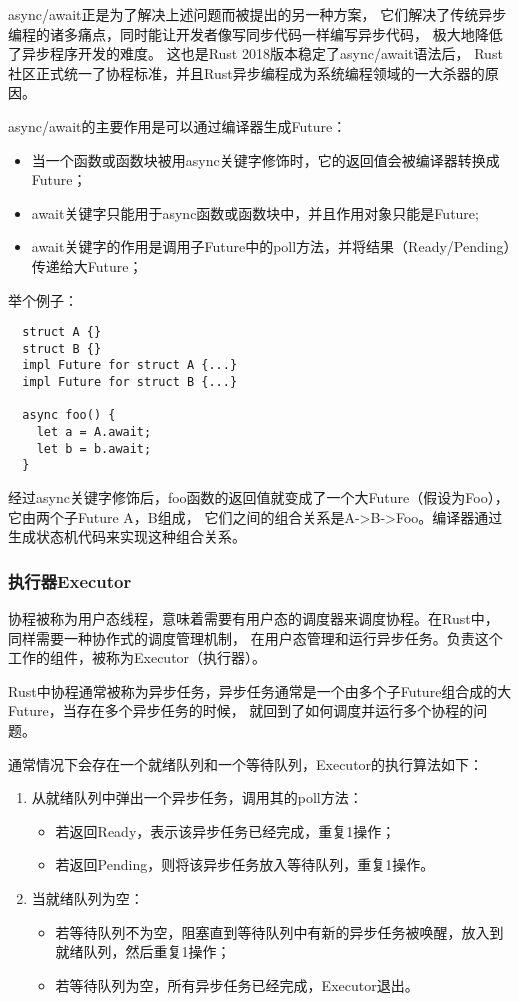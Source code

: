 \documentclass[supercite]{HustGraduPaper}
\theoremstyle{definition}
\begin{document}
async/await正是为了解决上述问题而被提出的另一种方案，
它们解决了传统异步编程的诸多痛点，同时能让开发者像写同步代码一样编写异步代码，
极大地降低了异步程序开发的难度。
这也是Rust 2018版本稳定了async/await语法后，
Rust社区正式统一了协程标准，并且Rust异步编程成为系统编程领域的一大杀器的原因。

async/await的主要作用是可以通过编译器生成Future：
\begin{itemize}
  \item 当一个函数或函数块被用async关键字修饰时，它的返回值会被编译器转换成Future；
  \item await关键字只能用于async函数或函数块中，并且作用对象只能是Future;
  \item await关键字的作用是调用子Future中的poll方法，并将结果（Ready/Pending）传递给大Future；
\end{itemize}

举个例子：
\begin{lstlisting}
  struct A {}
  struct B {}
  impl Future for struct A {...}
  impl Future for struct B {...}

  async foo() {
    let a = A.await;
    let b = b.await;
  }
\end{lstlisting}

经过async关键字修饰后，foo函数的返回值就变成了一个大Future（假设为Foo），它由两个子Future A，B组成，
它们之间的组合关系是A->B->Foo。编译器通过生成状态机代码来实现这种组合关系。\par

\subsubsection{执行器Executor}
协程被称为用户态线程，意味着需要有用户态的调度器来调度协程。在Rust中，同样需要一种协作式的调度管理机制，
在用户态管理和运行异步任务。负责这个工作的组件，被称为Executor（执行器）。\par

Rust中协程通常被称为异步任务，异步任务通常是一个由多个子Future组合成的大Future，当存在多个异步任务的时候，
就回到了如何调度并运行多个协程的问题。\par

通常情况下会存在一个就绪队列和一个等待队列，Executor的执行算法如下：
\begin{enumerate}
  \item 从就绪队列中弹出一个异步任务，调用其的poll方法：
    \begin{itemize}
      \item 若返回Ready，表示该异步任务已经完成，重复1操作；
      \item 若返回Pending，则将该异步任务放入等待队列，重复1操作。
    \end{itemize}
  \item 当就绪队列为空：
    \begin{itemize}
      \item 若等待队列不为空，阻塞直到等待队列中有新的异步任务被唤醒，放入到就绪队列，然后重复1操作；
      \item 若等待队列为空，所有异步任务已经完成，Executor退出。
    \end{itemize}
\end{enumerate}
\end{document}
